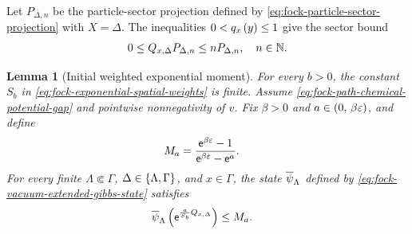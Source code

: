 \documentclass[11pt,a4paper]{article}
\theoremstyle{plain}
\newtheorem{lem}[thm]{Lemma}
\theoremstyle{definition}
\theoremstyle{remark}
\begin{document}
Let \(P_{\Delta,n}\) be the particle-sector projection defined by \eqref{eq:fock-particle-sector-projection} with \(X=\Delta\). The inequalities \(0<q_x \left( y \right)\leq1\) give the sector bound \begin{equation}
\begin{aligned}
0
\leq
Q_{x,\Delta}P_{\Delta,n}
\leq
nP_{\Delta,n},
\quad
n\in\mathbb{N}.
\end{aligned}
\label{eq:fock-weighted-number-sector-bound}
\end{equation}

\begin{lem}[Initial weighted exponential moment]
For every $b>0$, the constant $S_b$ in \eqref{eq:fock-exponential-spatial-weights} is finite.
Assume \eqref{eq:fock-path-chemical-potential-gap} and pointwise nonnegativity of $v$.
Fix $\beta>0$ and $a\in\left( 0,\,\beta\varepsilon \right)$, and define
\begin{equation}
\begin{aligned}
M_a
& =
\frac{\mathsf{e}^{\beta\varepsilon}-1}
{\mathsf{e}^{\beta\varepsilon}-\mathsf{e}^a}.
\end{aligned}
\label{eq:fock-weighted-moment-constant}
\end{equation}
For every finite $\Lambda\Subset\Gamma$, $\Delta\in\left\{ \Lambda,\Gamma \right\}$, and $x\in\Gamma$,
the state $\oastate[\overline{\psi}_{\Lambda}]$ defined by
\eqref{eq:fock-vacuum-extended-gibbs-state} satisfies
\begin{equation}
\begin{aligned}
\fun{\oastate[\overline{\psi}_{\Lambda}]}{
\napiernum^{\frac{a}{S_b}Q_{x,\Delta}}}
& \leq
M_a.
\end{aligned}
\label{eq:fock-initial-weighted-exponential-moment}
\end{equation}
\end{lem}
\end{document}
